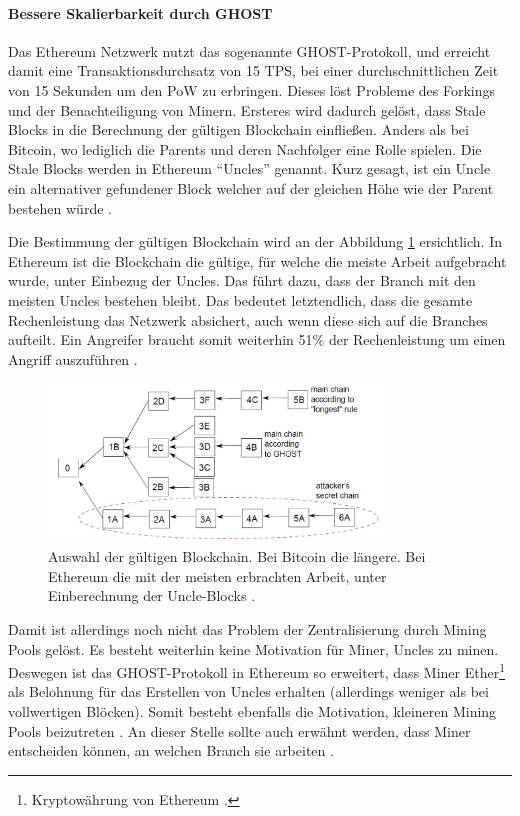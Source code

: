 \paragraph{Bessere Skalierbarkeit durch GHOST}
Das Ethereum Netzwerk nutzt das sogenannte GHOST-Protokoll, und erreicht damit eine Transaktionsdurchsatz von 15 TPS, bei einer durchschnittlichen Zeit von 15 Sekunden um den PoW zu erbringen. Dieses löst Probleme des Forkings und der Benachteiligung von Minern. Ersteres wird dadurch gelöst, dass Stale Blocks in die Berechnung der gültigen Blockchain einfließen. Anders als bei Bitcoin, wo lediglich die Parents und deren Nachfolger eine Rolle spielen. Die Stale Blocks werden in Ethereum ``Uncles'' genannt. Kurz gesagt, ist ein Uncle ein alternativer gefundener Block welcher auf der gleichen Höhe wie der Parent bestehen würde \cite{EthereumTeamEthereumWhitePaper2017}.

Die Bestimmung der gültigen Blockchain wird an der Abbildung \ref{fig:forking-risks} ersichtlich. In Ethereum ist die Blockchain die gültige, für welche die meiste Arbeit aufgebracht wurde, unter Einbezug der Uncles. Das führt dazu, dass der Branch mit den meisten Uncles bestehen bleibt. Das bedeutet letztendlich, dass die gesamte Rechenleistung das Netzwerk absichert, auch wenn diese sich auf die Branches aufteilt. Ein Angreifer braucht somit weiterhin 51\% der Rechenleistung um einen Angriff auszuführen \cite{SompolinskyAcceleratingBitcoinTransaction2013}.

\begin{figure}[!htbp]
  \centering
    \includegraphics[width=0.8\textwidth,angle=0]{images/forking-risks}
     \caption{Auswahl der gültigen Blockchain. Bei Bitcoin die längere. Bei Ethereum die mit der meisten erbrachten Arbeit, unter Einberechnung der Uncle-Blocks \cite{SompolinskyAcceleratingBitcoinTransaction2013}.}
    \label{fig:forking-risks}
\end{figure} 

Damit ist allerdings noch nicht das Problem der Zentralisierung durch Mining Pools gelöst. Es besteht weiterhin keine Motivation für Miner, Uncles zu minen. Deswegen ist das GHOST-Protokoll in Ethereum so erweitert, dass Miner Ether\footnote{Kryptowährung von Ethereum \cite{EthereumTeamEthereumWhitePaper2017}.} als Belohnung für das Erstellen von Uncles erhalten (allerdings weniger als bei vollwertigen Blöcken). Somit besteht ebenfalls die Motivation, kleineren Mining Pools beizutreten \cite{EthereumTeamEthereumWhitePaper2017}. An dieser Stelle sollte auch erwähnt werden, dass Miner entscheiden können, an welchen Branch sie arbeiten \cite{ZhengBlockchainChallengesOpportunities2017}.

